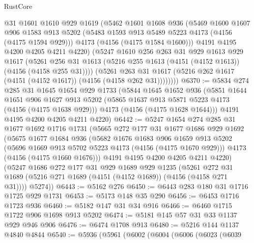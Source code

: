\begin{lexlean}{RustCore}
\begin{coremodule}
          @31
          @1601
          @1610
          @929
          @1619
          (@5462
            @1601
            @1608
            @936
            (@5469
              @1600
              @1607
              @906
              @1583
              @913
              @5202
              (@5483 @1593 @913 @5489 @5223 @4173 (@4156 (@4175 @1594 @929)))
              @4173
              (@4156 (@4175 @1584 @1600)))
            @4191
            @4195
            @4200
            @4205
            @4211
            @4220)
          (@5247
            @1610
            @256
            @263
            @31
            @929
            @1613
            @929
            @1617
            (@5261 @256 @31 @1613 (@5216 @255 @1613 (@4151 (@4152 @1613)) (@4156 (@4158 @255 @31))))
            (@5261
              @263
              @31
              @1617
              (@5216 @262 @1617 (@4151 (@4152 @1617)) (@4156 (@4158 @262 @31))))))))
@6370 := @5834
    @274
    @285
    @31
    @1645
    @1654
    @929
    @1733
    (@5844
      @1645
      @1652
      @936
      (@5851
        @1644
        @1651
        @906
        @1627
        @913
        @5202
        (@5865 @1637 @913 @5871 @5223 @4173 (@4156 (@4175 @1638 @929)))
        @4173
        (@4156 (@4175 @1628 @1644)))
      @4191
      @4195
      @4200
      @4205
      @4211
      @4220)
@6442 := @5247
    @1654
    @274
    @285
    @31
    @1677
    @1692
    @1716
    @1731
    (@5665
      @272
      @177
      @31
      @1677
      @1686
      @929
      @1692
      (@5675
        @1677
        @1684
        @936
        (@5682
          @1676
          @1683
          @906
          @1659
          @913
          @5202
          (@5696 @1669 @913 @5702 @5223 @4173 (@4156 (@4175 @1670 @929)))
          @4173
          (@4156 (@4175 @1660 @1676)))
        @4191
        @4195
        @4200
        @4205
        @4211
        @4220)
      (@5247
        @1686
        @272
        @177
        @31
        @929
        @1689
        @929
        @1235
        (@5261 @272 @31 @1689 (@5216 @271 @1689 (@4151 (@4152 @1689)) (@4156 (@4158 @271 @31))))
        @5274))
@6443 := @5162 @276
@6450 := @6443 @283 @180 @31 @1716 @1725 @929 @1731
@6453 := @5173 @148 @35 @290
@6456 := @6453 @1716 @1723 @936
@6460 := @5182 @147 @31 @34 @916
@6466 := @6460 @1715 @1722 @906 @1698 @913 @5202
@6474 := @5181 @145 @57 @31 @33 @1137 @929 @946 @906
@6476 := @6474 @1708 @913
@6480 := @5216 @144 @1137 @4840 @4844
@6540 := @5936
    (@5961
      (@6002
        (@6004
          (@6006
            (@6023
              (@6039

\end{coremodule}
\end{lexlean}
